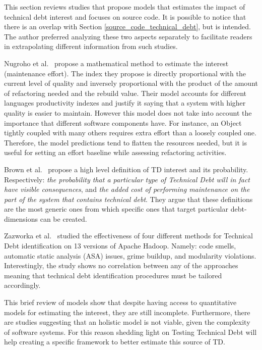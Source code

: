 This section reviews studies that propose models that estimates the impact of technical debt interest and focuses on source code. It is possible to notice that there is an overlap with Section \ref{source_code_technical_debt}, but is intended. The author preferred analyzing these two aspects separately to facilitate readers in extrapolating different information from such studies.

Nugroho et al.\ \cite{technicalDebtInterest} propose a mathematical method to estimate the interest (maintenance effort). The index they propose is directly proportional with the current level of quality and inversely proportional with the product of the amount of refactoring needed and the rebuild value. Their model accounts for different languages productivity indexes and justify it saying that a system with higher quality is easier to maintain. However this model does not take into account the importance that different software components have. For instance, an Object tightly coupled with many others requires extra effort than a loosely coupled one. Therefore, the model predictions tend to flatten the resources needed, but it is useful for setting an effort baseline while assessing refactoring activities.

Brown et al.\ \cite{td_current_vs_optimal_quality} propose a high level definition of TD interest and its probability. Respectively: \textit{the probability that a particular type of Technical Debt will in fact have visible consequences}, and \textit{the added cost of performing maintenance on the part of the system that contains technical debt}. They argue that these definitions are the most generic ones from which specific ones that target particular debt-dimensions can be created.

Zazworka et al.\ \cite{4_methods_to_identify_td} studied the effectiveness of four different methods for Technical Debt identification on 13 versions of Apache Hadoop. Namely: code smells, automatic static analysis (ASA) issues, grime
buildup, and modularity violations. Interestingly, the study shows no correlation between any of the approaches meaning that technical debt identification procedures must be tailored accordingly.

This brief review of models show that despite having access to quantitative models for estimating the interest, they are still incomplete. Furthermore, there are studies suggesting that an holistic model is not viable, given the complexity of software systems. For this reason shedding light on Testing Technical Debt will help creating a specific framework to better estimate this source of TD.
